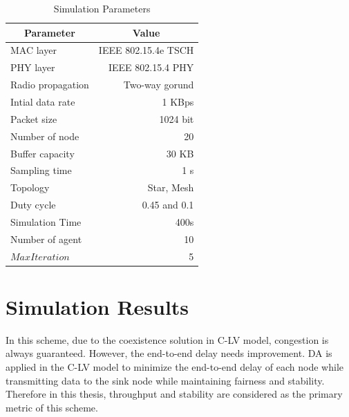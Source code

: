 \begin{table}
	\centering
	\caption{Simulation Parameters}
	\label{my-label3}
	\begin{tabular}{|l|r|}
		\hline
		\multicolumn{1}{|c|}{Parameter} & \multicolumn{1}{c|}{Value} \\ \hline
		MAC layer                       & IEEE 802.15.4e  TSCH       \\ \hline
		PHY layer                       & IEEE 802.15.4 PHY          \\ \hline
		Radio propagation               & Two-way gorund             \\ \hline
		Intial data rate                & 1 KBps                     \\ \hline
		Packet size                     & 1024 bit                   \\ \hline
		Number of node                  & 20                         \\ \hline
		Buffer capacity                 & 30 KB                      \\ \hline
		Sampling time                   & 1 s                        \\ \hline
		Topology                        & Star, Mesh                 \\ \hline
		Duty cycle                      & 0.45 and 0.1               \\ \hline
		Simulation Time                 & 400s                       \\ \hline
		Number of agent                 & 10                         \\ \hline
		$MaxIteration$                  & 5                          \\ \hline
	\end{tabular}
\end{table}

\section {Simulation Results}

In this scheme, due to the coexistence solution in C-LV model, congestion is always guaranteed. However, the end-to-end delay needs improvement. DA is applied in the C-LV model to minimize the end-to-end delay of each node while transmitting data to the sink node while maintaining fairness and stability. Therefore in this thesis, throughput and stability are considered as the primary metric of this scheme.

